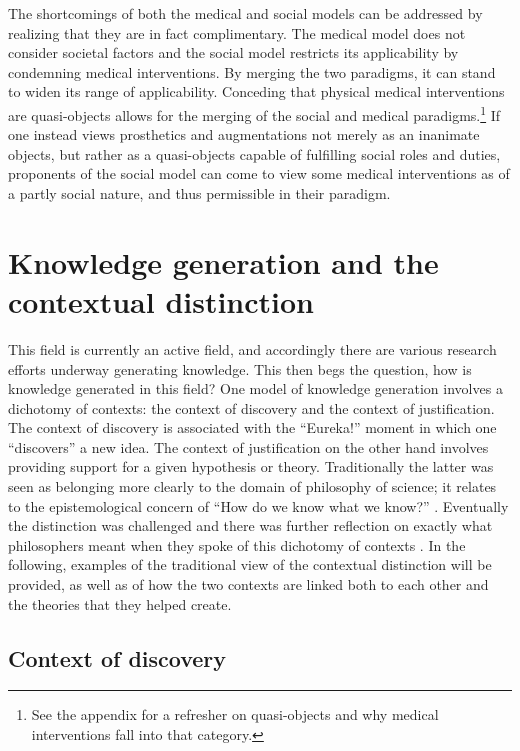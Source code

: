 \documentclass[a4paper]{article}
\begin{document}
The shortcomings of both the medical and social models can be addressed by
realizing that they are in fact complimentary. The medical model does not
consider societal factors and the social model restricts its applicability by
condemning medical interventions. By merging the two paradigms, it can stand
to widen its range of applicability. Conceding that physical medical
interventions are  quasi-objects allows for the merging of the social and
medical paradigms.\footnote{See the appendix for a refresher on quasi-objects
and why medical interventions fall into that category.} If one instead views
prosthetics and augmentations not merely as an inanimate objects, but rather
as a quasi-objects capable of fulfilling social roles and duties, proponents
of the social model can come to view some medical interventions as of a partly
social nature, and thus permissible in their paradigm.

\newpage
\section{Knowledge generation and the contextual distinction}

This field is currently an active field, and accordingly there are various
research efforts underway generating knowledge. This then begs the question,
how is knowledge generated in this field? One model of knowledge generation
involves a dichotomy of contexts: the context of discovery and the context of
justification. The context of discovery is associated with the ``Eureka!''
moment in which one ``discovers'' a new idea. The context of justification on
the other hand involves providing support for a given hypothesis or theory.
Traditionally the latter was seen as belonging more clearly to the domain of
philosophy of science; it relates to the epistemological concern of ``How do
we know what we know?'' \citep{schickore2014scientific}. Eventually the
distinction was challenged and there was further reflection on exactly what
philosophers meant when they spoke of this dichotomy of contexts
\citep{hoyningen2006context}. In the following, examples of the traditional
view of the contextual distinction will be provided, as well as of how the two
contexts are linked both to each other and the theories that they helped
create.

\subsection{Context of discovery}
\end{document}
